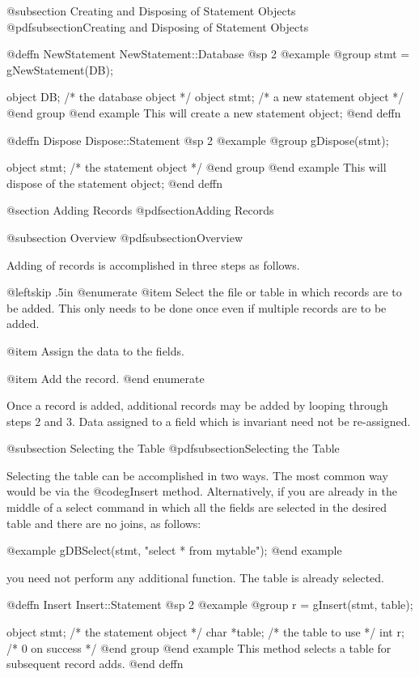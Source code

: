 @subsection Creating and Disposing of Statement Objects
@pdfsubsection{Creating and Disposing of Statement Objects}


@deffn {NewStatement}  NewStatement::Database
@sp 2
@example
@group
stmt = gNewStatement(DB);

object  DB;     /*  the database object      */
object  stmt;   /*  a new statement object   */
@end group
@end example
This will create a new statement object;
@end deffn



@deffn {Dispose}  Dispose::Statement
@sp 2
@example
@group
gDispose(stmt);

object  stmt;   /*  the statement object   */
@end group
@end example
This will dispose of the statement object;
@end deffn



@section Adding Records
@pdfsection{Adding Records}

@subsection Overview
@pdfsubsection{Overview}

Adding of records is accomplished in three steps as follows.

{@leftskip .5in
@enumerate
@item
Select the file or table in which records are to be added.  This only
needs to be done once even if multiple records are to be added.

@item
Assign the data to the fields.

@item
Add the record.
@end enumerate
}

Once a record is added, additional records may be added by looping through
steps 2 and 3.  Data assigned to a field which is invariant need not be
re-assigned.

@subsection Selecting the Table
@pdfsubsection{Selecting the Table}

Selecting the table can be accomplished in two ways.  The most common way would be
via the @code{gInsert} method.  Alternatively, if you are already in the middle of a select
command in which all the fields are selected in the desired table and there are no
joins, as follows:

@example
gDBSelect(stmt, "select * from mytable");
@end example

you need not perform any additional function.  The table is already selected.

@deffn {Insert}  Insert::Statement
@sp 2
@example
@group
r = gInsert(stmt, table);

object  stmt;   /*  the statement object  */
char    *table; /*  the table to use      */
int     r;      /*  0 on success          */
@end group
@end example
This method selects a table for subsequent record adds.
@end deffn


